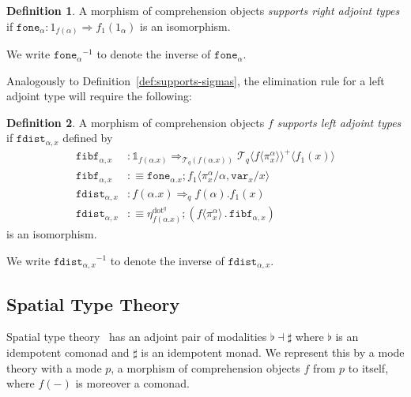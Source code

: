 \documentclass[10pt]{article}
\theoremstyle{definition}
\newtheorem{definition}{Definition}
\let\emptyset\varnothing
\newcommand{\tcell}{\Rightarrow}
\newcommand\TrPlus[2]{\ensuremath{{#1}^+(#2)}}
\newcommand\El[2]{\mathcal{T}_{#1}(#2)}
\newcommand\ApEl[2]{\mathcal{T}_{#1}\langle#2\rangle}
\newcommand\bdot[0]{\mathbin{.}}
\newcommand\ap[2]{\ensuremath{#1 \langle #2 \rangle }}
\newcommand\ApPlus[2]{\ensuremath{{#1}^+ \langle #2 \rangle }}
\newcommand{\sdot}{\ensuremath{\mathrm{dot}}}
\newcommand\One{\ensuremath{\mathds{1}}}
\newcommand\var[1]{\ensuremath{\mathtt{var}_{#1}}}
\newcommand\fone[1]{\ensuremath{\mathtt{fone}_{#1}}}
\newcommand\fibf[1]{\ensuremath{\mathtt{fibf}_{#1}}}
\newcommand\foneinv[1]{\ensuremath{\fone{#1}^{-1}}}
\newcommand\fdist[1]{\ensuremath{\mathtt{fdist}_{#1}}}
\newcommand\fdistinv[1]{\ensuremath{\fdist{#1}^{-1}}}
\begin{document}
\begin{definition} \label{def:supports-right-adjoint}
A morphism of comprehension objects \emph{supports right adjoint types}
if $\fone{\alpha} : 1_{f(\alpha)} \tcell f_1(1_\alpha)$ is an isomorphism.
\end{definition}
We write $\foneinv{\alpha}$ to denote the inverse of $\fone{\alpha}$.

Analogously to Definition~\ref{def:supports-sigmas}, the elimination
rule for a left adjoint type will require the following:

\begin{definition} \label{def:supports-left}
A morphism of comprehension objects $f$ \emph{supports left adjoint types} if $\fdist{\alpha, x}$ defined by
\begin{align*}
\fibf{\alpha, x} &: \One_{f(\alpha.x)} \tcell_{\El{q}{f(\alpha.x)}} \ApPlus{\ApEl{q}{\ap{f}{\pi^\alpha_x}}}{f_1(x)} \\
\fibf{\alpha, x} &:\equiv \fone{\alpha.x};\ap{f_1}{\pi^\alpha_x/\alpha, \var{x}/x} \\
\fdist{\alpha, x} &: f(\alpha.x) \tcell_q f(\alpha).f_1(x) \\
\fdist{\alpha, x} &:\equiv \eta^{\sdot^q}_{f(\alpha.x)} ; (\ap{f}{\pi^\alpha_x} \bdot \fibf{\alpha, x})
\end{align*}
is an isomorphism.
\end{definition}
We write $\fdistinv{\alpha,x}$ to denote the inverse of $\fdist{\alpha,x}$.


\subsection{Spatial Type Theory}

Spatial type theory~\citep{shulman15realcohesion} has an adjoint pair of
modalities $\flat \dashv \sharp$ where $\flat$ is an idempotent comonad
and $\sharp$ is an idempotent monad.  We represent this by a mode theory
with a mode $p$, a morphism of comprehension objects $f$ from $p$ to
itself, where $f(-)$ is moreover a comonad.
\end{document}
